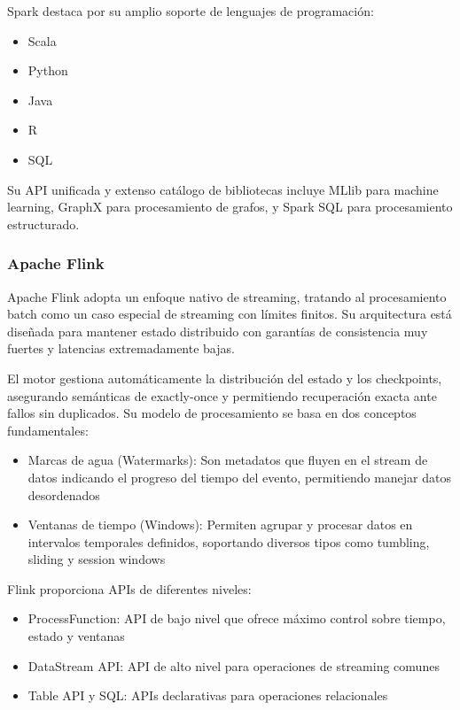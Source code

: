 Spark destaca por su amplio soporte de lenguajes de programación:

\begin{itemize}
    \item Scala
    \item Python
    \item Java 
    \item R
    \item SQL
\end{itemize}

Su API unificada y extenso catálogo de bibliotecas incluye MLlib para machine learning, GraphX para procesamiento de
grafos, y Spark SQL para procesamiento estructurado.

\newpage
\subsubsection{Apache Flink}

Apache Flink adopta un enfoque nativo de streaming, tratando al procesamiento batch como un caso especial de streaming
con límites finitos. Su arquitectura está diseñada para mantener estado distribuido con garantías de consistencia muy
fuertes y latencias extremadamente bajas.\newline

El motor gestiona automáticamente la distribución del estado y los checkpoints,
asegurando semánticas de exactly-once y permitiendo recuperación exacta ante fallos sin duplicados.
Su modelo de procesamiento se basa en dos conceptos fundamentales:

\begin{itemize}
    \item Marcas de agua (Watermarks): Son metadatos que fluyen en el stream de datos indicando el progreso del tiempo del evento,
    permitiendo manejar datos desordenados
    \item Ventanas de tiempo (Windows): Permiten agrupar y procesar datos en intervalos temporales definidos, soportando diversos
    tipos como tumbling, sliding y session windows
\end{itemize}

Flink proporciona APIs de diferentes niveles:

\begin{itemize}
    \item ProcessFunction: API de bajo nivel que ofrece máximo control sobre tiempo, estado y ventanas
    \item DataStream API: API de alto nivel para operaciones de streaming comunes
    \item Table API y SQL: APIs declarativas para operaciones relacionales   
\end{itemize}

